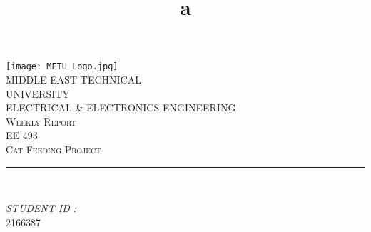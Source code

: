 \documentclass[12pt]{article}
\title{a}
\begin{document}

\begin{titlepage}
	\centering
    \vspace*{0.5 cm}
    \texttt{[image: METU\_Logo.jpg]}\\[0.5 cm]	%
    \textsc{\Large MIDDLE EAST TECHNICAL} \\[0.2 cm]
    \textsc{\Large UNIVERSITY} \\ [1.0 cm]
    \textsc{\large ELECTRICAL \& ELECTRONICS ENGINEERING} \\[0.2 cm]
    \textsc{\large Weekly Report \weekNum}\\[0.2 cm]
	\textsc{\large EE 493}\\[0.5 cm]				%
	\textsc{\large Cat Feeding Project}\\[0.2 cm]
	\rule{\linewidth}{0.2 mm} \\[0.2 cm]
	
	\begin{minipage}{0.4\textwidth}
		
			\begin{flushright} 
			\emph{STUDENT ID :} \\
			2166387\linebreak
		\end{flushright}
	\end{minipage}\\[2 cm]
	
	\vfill
	
\end{titlepage}


\tableofcontents











\end{document}

